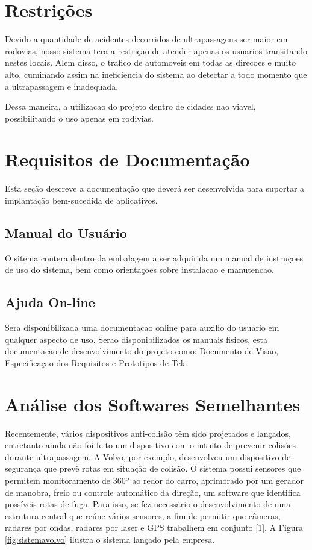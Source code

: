\section{Restrições}
Devido a quantidade de acidentes decorridos de ultrapassagens ser maior em rodovias, nosso sistema tera a restriçao de atender apenas os usuarios transitando nestes locais. Alem disso, o trafico de automoveis em todas as direcoes e muito alto, cuminando assim na ineficiencia do sistema ao detectar a todo momento que a ultrapassagem e inadequada.

Dessa maneira, a utilizacao do projeto dentro de cidades nao viavel, possibilitando o uso apenas em rodivias.

\section{Requisitos de Documentação}
Esta seção descreve a documentação que deverá ser desenvolvida para suportar a implantação bem-sucedida de aplicativos.

\subsection{Manual do Usuário}
O sitema contera dentro da embalagem a ser adquirida um manual de instruçoes de uso do sistema, bem como orientaçoes sobre instalacao e manutencao.

\subsection{Ajuda On-line}
Sera disponibilizada uma documentacao online para auxilio do usuario em qualquer aspecto de uso. Serao disponibilizados os manuais fisicos, esta documentacao de desenvolvimento do projeto como: Documento de Visao, Especificaçao dos Requisitos e Prototipos de Tela

\section{Análise dos Softwares Semelhantes}
Recentemente, vários dispositivos anti-colisão têm sido projetados e lançados, entretanto ainda não foi feito um dispositivo com o intuito
de prevenir colisões durante ultrapassagem. A Volvo, por exemplo, desenvolveu um dispositivo de segurança que prevê rotas em situação de
colisão. O sistema possui sensores que permitem monitoramento de 360º ao redor do carro, aprimorado por um gerador de manobra, freio ou controle
automático da direção, um software que identifica possíveis rotas de fuga. Para isso, se fez necessário o desenvolvimento de uma estrutura central
que reúne vários sensores, a fim de permitir que câmeras, radares por ondas, radares por laser e GPS trabalhem em conjunto [1]. A Figura \ref{fig:sistemavolvo} ilustra
 o sistema lançado pela empresa.

